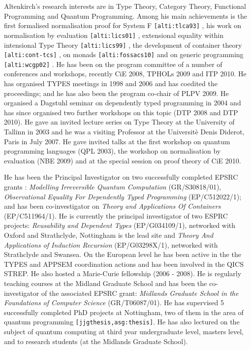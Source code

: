 \documentclass[a4paper]{article}
\renewcommand{\cite}[1]{{\tt[#1]}}
\newcommand{\citetrack}[1]{\cite{#1}}
\begin{document}
Altenkirch's research interests are in Type Theory, Category Theory, Functional
Programming and Quantum Programming. 
Among his main achievements is
the first formalised normalisation proof for System F
\citetrack{alti:tlca93}
, his work on normalisation by evaluation 
\citetrack{alti:lics01}%
, extensional equality within intensional Type Theory \citetrack{alti:lics99}
, the development of container theory \citetrack{alti:cont-tcs}%
, on
monads \citetrack{alti:fossacs10} 
and on generic programming 
\citetrack{alti:wcgp02}
.
He has been on the program committee of a number of conferences and
workshops, recently CiE 2008, TPHOLs 2009 and ITP 2010. He has
organised TYPES meetings in 1998 and 2006 and has coedited the
proceedings; and he has also been the program co-chair of PLPV 2009.  He
organised a Dagstuhl seminar on dependently typed programming in 2004
and has since organised two further workshops on this topic (DTP 2008
and DTP 2010). He gave an invited lecture series on Type Theory at the
University of Tallinn in 2003 and he was a visiting Professor at the
Universit\`{e} Denis Diderot, Paris in  July 2007. He gave invited talks
at the first workshop on quantum programming languages (QPL 2003), the
workshop on normalisation by evaluation (NBE 2009) and at the special
session on proof theory of CiE 2010.


He has been the Principal Investigator on two successfully completed
EPSRC grants : \emph{Modelling Irreversible Quantum Computation}
(GR/S30818/01), \emph{Observational Equality For Dependently Typed
  Programming} (EP/C512022/1); and has been co-investigator on
\emph{Theory and Applications Of Containers} (EP/C511964/1). 
He is currently the principal investigator of two ESPRC
projects: \emph{Reusability and Dependent Types} (EP/G034109/1), 
networked with
Oxford and Strathclyde, Nottingham is the lead site and 
\emph{Theory And Applications of Induction
  Recursion} (EP/G03298X/1), networked with Strathclyde and Swansea. 
On the European level he has been active in the the
TYPES and APPSEM coordination actions and has been involved in the
QICS STREP. He also hosted a Marie-Curie fellowship (2006 - 2008). He
is regularly teaching courses at the Midland Graduate School and has
been the co-investigator of the associated EPSRC grant: \emph{Midlands
  Graduate School in the Foundations of Computer Science}
(GR/T06087/01). He has supervised 5 successfully completed PhD
projects at Nottingham, two of them in the area of quantum
programming \citetrack{jjgthesis,asg:thesis}. He has also lectured 
on the subject of quantum computing at third year
undergraduate level, masters level, and to research students 
(at the Midlands Graduate School).
\end{document}
